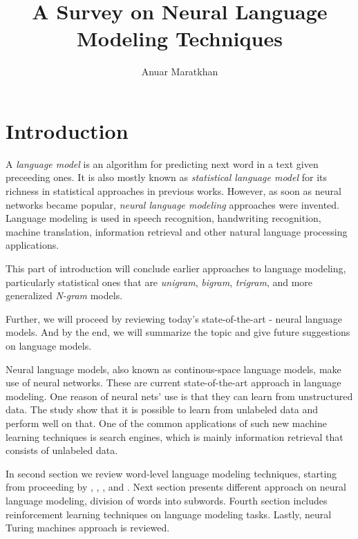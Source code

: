 \documentclass{IEEEtran}
\begin{document}
\title{A Survey on Neural Language Modeling Techniques}

\author{Anuar Maratkhan}

\maketitle

\section{Introduction}

A \textit{language model} is an algorithm for predicting next word in a text given preceeding ones. It is also mostly known as \textit{statistical language model} for its richness in statistical approaches in previous works. However, as soon as neural networks became popular, \textit{neural language modeling} approaches were invented. Language modeling is used in speech recognition, handwriting recognition, machine translation, information retrieval and other natural language processing applications.

This part of introduction will conclude earlier approaches to language modeling, particularly statistical ones that are \textit{unigram}, \textit{bigram}, \textit{trigram}, and more generalized \textit{N-gram} models.

Further, we will proceed by reviewing today's state-of-the-art - neural language models. And by the end, we will summarize the topic and give future suggestions on language models.

Neural language models, also known as continous-space language models, make use of neural networks. These are current state-of-the-art approach in language modeling. One reason of neural nets' use is that they can learn from unstructured data. The study \cite{unsupervised} show that it is possible to learn from unlabeled data and perform well on that. One of the common applications of such new machine learning techniques is search engines, which is mainly information retrieval that consists of unlabeled data.

In second section we review word-level language modeling techniques, starting from \cite{Mikolov2010NeuralLM} proceeding by \cite{Zaremba2014LSTM}, \cite{Ghahramani2016Dropout}, \cite{Inan2016TiedLSTM}, and \cite{Salakhutdinov2017Softmax}. Next section presents different approach on neural language modeling, division of words into subwords. Fourth section includes reinforcement learning techniques on language modeling tasks. Lastly, neural Turing machines approach is reviewed.
\end{document}
